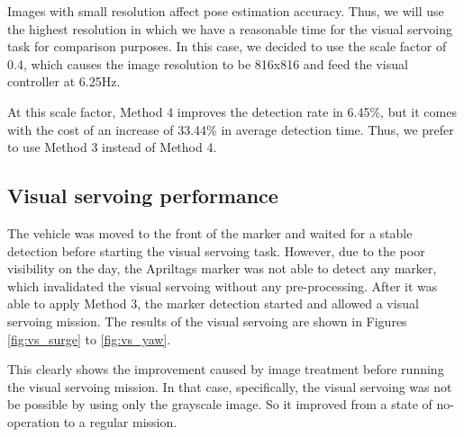 \documentclass[conference, letterpaper]{IEEEtran}
\begin{document}
Images with small resolution affect pose estimation accuracy. Thus, we
will use the highest resolution in which we have a reasonable time for the
visual servoing task for comparison purposes. In this case, we decided to use the scale
factor of 0.4, which causes the image resolution to be 816x816 and feed the
visual controller at 6.25Hz.

At this scale factor, Method 4 improves the detection rate in 6.45\%, but it
comes with the cost of an increase of 33.44\% in average detection time. Thus,
we prefer to use Method 3 instead of Method 4.

\subsection{Visual servoing performance}


The vehicle was moved to the front of the marker and waited for a stable
detection before starting the visual servoing task. However, due to the poor
visibility on the day, the Apriltags marker was not able to detect any marker,
which invalidated the visual servoing without any pre-processing. After it was
able to apply Method 3, the marker detection started and allowed a visual
servoing mission. The results of the visual servoing are shown in Figures
\ref{fig:vs_surge} to \ref{fig:vs_yaw}.


This clearly shows the improvement caused by image treatment before
running the visual servoing mission. In that case, specifically, the visual
servoing was not be possible by using only the grayscale image. So it improved
from a state of no-operation to a regular mission.
\end{document}
